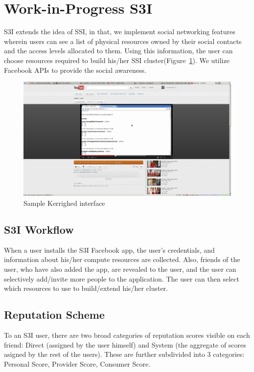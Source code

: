 \documentclass[10pt, conference, compsocconf]{IEEEtran}
\begin{document}
\section{Work-in-Progress S3I}
\label{sec:Work-in-Progress S3I}
S3I extends the idea of SSI, in that, we implement social networking
features wherein users can see a list of physical resources owned by their
social contacts and the access levels allocated to them.
Using this information, the user can choose resources required to build
his/her SSI cluster(Figure~\ref{fig:sassi-screenshot}). We utilize Facebook
APIs\cite{facebook-developer} to provide the social
awareness.


\begin{figure}[htbp]
 \centering
   \includegraphics[scale=0.28]{figures/sassi-screenshot}
\caption{Sample Kerrighed interface}
\label{fig:sassi-screenshot}
\end{figure}

\subsection{S3I Workflow}
When a user installs the S3I Facebook\cite{facebook} app,
the user's credentials, and information about his/her compute
resources are collected.
Also, friends of the user, who have also added the app,
are revealed to the user, and the user can selectively add/invite
more people to the application. The user can then select which
resources to use to build/extend his/her cluster.

\subsection{Reputation Scheme}
To an S3I user, there are two broad categories of reputation
scores visible on each friend: Direct (assigned by the 
user himself) and System (the aggregate of scores asigned by
the rest of the users). These are further subdivided into
3 categories: Personal Score, Provider Score, Consumer Score.
\end{document}
